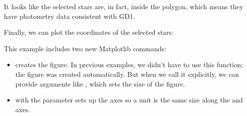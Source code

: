 \documentclass[letterpaper,10pt,english]{sphinxmanual}
\begin{document}
\noindent{}

It looks like the selected stars are, in fact, inside the polygon, which means they have photometry data consistent with GD\sphinxhyphen{}1.

Finally, we can plot the coordinates of the selected stars:

\begin{sphinxVerbatim}[commandchars=\\\{\}]

  \PYG{p}{[}\PYG{p}{]}
  \PYG{p}{[}\PYG{p}{]}

    


\end{sphinxVerbatim}

\noindent{}

This example includes two new Matplotlib commands:
\begin{itemize}
\item {} 
 creates the figure.  In previous examples, we didn’t have to use this function; the figure was created automatically.  But when we call it explicitly, we can provide arguments like , which sets the size of the figure.

\item {} 
 with the parameter  sets up the axes so a unit is the same size along the  and  axes.

\end{itemize}
\end{document}
